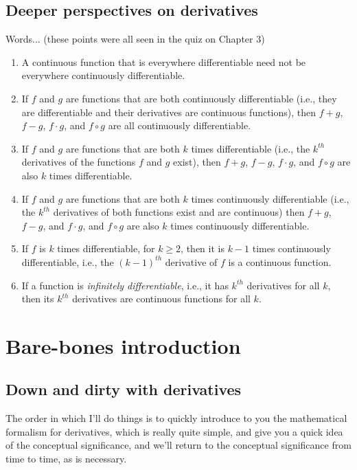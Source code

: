 \documentclass[10pt]{amsart}
\begin{document}
\subsection{Deeper perspectives on derivatives}

Words... (these points were all seen in the quiz on Chapter 3)

\begin{enumerate}
\item A continuous function that is everywhere differentiable need not
  be everywhere continuously differentiable.
\item If $f$ and $g$ are functions that are both continuously
  differentiable (i.e., they are differentiable and their derivatives
  are continuous functions), then $f + g$, $f - g$, $f \cdot g$, and
  $f \circ g$ are all continuously differentiable.
\item If $f$ and $g$ are functions that are both $k$ times
  differentiable (i.e., the $k^{th}$ derivatives of the functions $f$
  and $g$ exist), then $f + g$, $f - g$, $f \cdot g$, and $f \circ g$
  are also $k$ times differentiable.
\item If $f$ and $g$ are functions that are both $k$ times
  continuously differentiable (i.e., the $k^{th}$ derivatives of both
  functions exist and are continuous) then $f + g$, $f - g$, and $f
  \cdot g$, and $f \circ g$ are also $k$ times continuously
  differentiable.
\item If $f$ is $k$ times differentiable, for $k \ge 2$, then it is
  $k-1$ times continuously differentiable, i.e., the $(k-1)^{th}$
  derivative of $f$ is a continuous function.
\item If a function is {\em infinitely differentiable}, i.e., it has
  $k^{th}$ derivatives for all $k$, then its $k^{th}$ derivatives are
  continuous functions for all $k$.
\end{enumerate}

\section{Bare-bones introduction}

\subsection{Down and dirty with derivatives}

The order in which I'll do things is to quickly introduce to you the
mathematical formalism for derivatives, which is really quite simple,
and give you a quick idea of the conceptual significance, and we'll
return to the conceptual significance from time to time, as is
necessary.
\end{document}
